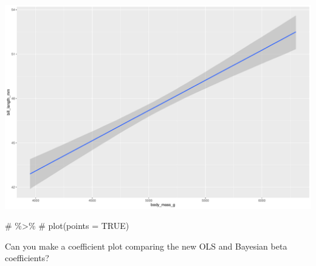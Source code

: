 \documentclass[
  letterpaper,
  DIV=11,
  numbers=noendperiod]{scrartcl}
\newenvironment{Shaded}{\begin{snugshade}}{\end{snugshade}}
\newcommand{\CommentTok}[1]{\textcolor[rgb]{0.37,0.37,0.37}{#1}}
\begin{document}
\includegraphics{Bayes_Lab_1_files/figure-pdf/unnamed-chunk-31-1.pdf}

\begin{Shaded}
\begin{Highlighting}[]
\CommentTok{\# \%\textgreater{}\% }
\CommentTok{\#   plot(points = TRUE)}
\end{Highlighting}
\end{Shaded}

Can you make a coefficient plot comparing the new OLS and Bayesian beta
coefficients?
\end{document}
